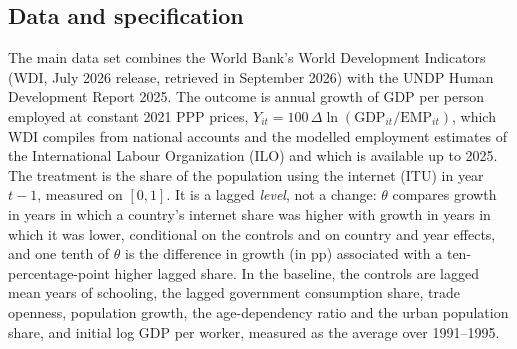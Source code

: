 \documentclass[pdflatex,sn-basic]{sn-jnl}%
\theoremstyle{thmstyleone}
\theoremstyle{thmstyletwo}
\begin{document}
\subsection{Data and specification}

The main data set combines the World Bank's World Development Indicators (WDI, July 2026 release, retrieved in September 2026) with the UNDP Human Development Report 2025. The outcome is annual growth of GDP per person employed at constant 2021 PPP prices, $Y_{it}=100\,\Delta\ln(\text{GDP}_{it}/\text{EMP}_{it})$, which WDI compiles from national accounts and the modelled employment estimates of the International Labour Organization (ILO) and which is available up to 2025. The treatment is the share of the population using the internet (ITU) in year $t-1$, measured on $[0,1]$. It is a lagged \emph{level}, not a change: $\theta$ compares growth in years in which a country's internet share was higher with growth in years in which it was lower, conditional on the controls and on country and year effects, and one tenth of $\theta$ is the difference in growth (in pp) associated with a ten-percentage-point higher lagged share. In the baseline, the controls are lagged mean years of schooling, the lagged government consumption share, trade openness, population growth, the age-dependency ratio and the urban population share, and initial log GDP per worker, measured as the average over 1991--1995.
\end{document}

